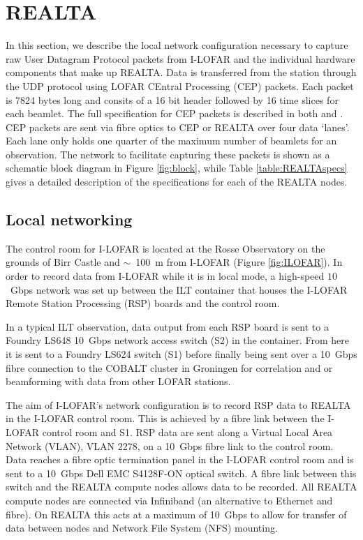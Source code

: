 \section{REALTA}
\label{sec:REALTA}
In this section, we describe the local network configuration necessary to capture raw User Datagram Protocol \citep[UDP;][]{Postel} packets from I-LOFAR and the individual hardware components that make up REALTA. Data is transferred from the station through the UDP protocol using LOFAR CEntral Processing (CEP) packets. Each packet is 7824 bytes long and consits of a 16 bit header followed by 16 time slices for each beamlet. The full specification for CEP packets is described in both \cite{Lubberhuizen2009} and \citet{Virtanen2018}.  CEP packets are sent via fibre optics to CEP or REALTA over four data `lanes'. Each lane only holds one quarter of the maximum number of beamlets for an observation.
The network to facilitate capturing these packets is shown as a schematic block diagram in Figure \ref{fig:block}, while Table \ref{table:REALTAspecs} gives a detailed description of the specifications for each of the REALTA nodes. 

\subsection{Local networking}
\label{sec:network}
The control room for I-LOFAR is located at the Rosse Observatory on the grounds of Birr Castle and $\sim$~100~m from I-LOFAR (Figure \ref{fig:ILOFAR}). In order to record data from I-LOFAR while it is in local mode, a high-speed $10$~Gbps network was set up between the ILT container that houses the I-LOFAR Remote Station Processing (RSP) boards and the control room.

In a typical ILT observation, data output from each RSP board is sent to a Foundry LS648 10~Gbps network access switch (S2) in the container. From here it is sent to a Foundry LS624 switch (S1) before finally being sent over a 10~Gbps fibre connection to the COBALT cluster in Groningen for correlation and or beamforming with data from other LOFAR stations.

The aim of I-LOFAR's network configuration is to record RSP data to REALTA in the I-LOFAR control room. This is achieved by a fibre link between the I-LOFAR control room and S1. RSP data are sent along a Virtual Local Area Network (VLAN), VLAN 2278, on a 10~Gbps fibre link to the control room. Data reaches a fibre optic termination panel in the I-LOFAR control room and is sent to a 10~Gbps Dell EMC S4128F-ON optical switch. A fibre link between this switch and the REALTA compute nodes allows data to be recorded. All REALTA compute nodes are connected via Infiniband (an alternative to Ethernet and fibre). On REALTA this acts at a maximum of 10~Gbps to allow for transfer of data between nodes and Network File System (NFS) mounting.


